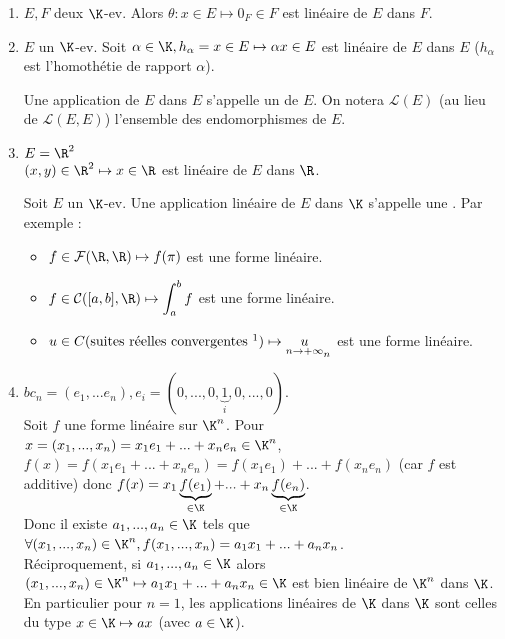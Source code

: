 \documentclass[12pt, a4paper]{report}
\begin{document}
\begin{exemple}[Exemples]{}
\begin{enumerate}
	\item $E,F$ deux $\K$-ev. Alors $\theta : x \in E \mapsto 0_F \in F$ est linéaire de $E$ dans $F$. 
	
	\item $E$ un $\K$-ev. Soit $\alpha \in \K, h_\alpha = x \in E \mapsto \alpha x \in E$ est linéaire de $E$ dans $E$ ($h_\alpha$ est l'homothétie de rapport $\alpha$).
	\begin{remarque}[Vocabulaire]{}
	Une application de $E$ dans $E$ s'appelle un  de $E$. On notera $\mathcal{L}(E)$ (au lieu de $\mathcal{L}(E,E)$) l'ensemble des endomorphismes de $E$.
	\end{remarque}
	
	\item $E = \R^2$ \\
	$(x,y) \in \R^2 \mapsto x \in \R$ est linéaire de $E$ dans $\R$.
	\begin{remarque}[Vocabulaire]{}
	Soit $E$ un $\K$-ev. Une application linéaire de $E$ dans $\K$ s'appelle une .
	Par exemple :
	\begin{itemize}
		\item $f \in \mathcal{F}(\R,\R) \mapsto f(\pi)$ est une forme linéaire.
		\item $f \in \mathcal{C}([a,b],\R) \mapsto \displaystyle{\int_{a}^b f}$ est une forme linéaire.
		\item $u \in C \text{(suites réelles convergentes \footnotemark)} \mapsto  \underset{n \to +\infty}u_n$ est une forme linéaire.
	\end{itemize}
	\end{remarque}
	
	\item {}
	
	$bc_n = (e_1,...e_n), e_i = (0,...,0,\underbrace{1}_{i},0,...,0)$. \\
	Soit $f$ une forme linéaire sur $\K^n$. Pour $x = (x_1,...,x_n) = x_1e_1+...+x_ne_n \in \K^n$, \\
	$f(x) = f(x_1e_1+...+x_ne_n) = f(x_1e_1)+ ...+f(x_ne_n)$ (car $f$ est additive)
	donc $f(x) = x_1\underbrace{f(e_1)}_{\in \K}+...+x_n\underbrace{f(e_n)}_{\in \K}$. \\
	Donc il existe $a_1,...,a_n \in \K$ tels que $\forall (x_1,...,x_n) \in \K^n, f(x_1,...,x_n) = a_1x_1+...+a_nx_n$. \\
	Réciproquement, si $a_1,...,a_n \in \K$ alors $(x_1,...,x_n) \in \K^n \mapsto a_1x_1+...+a_nx_n \in \K$ est bien linéaire de $\K^n$ dans $\K$. \\
	En particulier pour $n = 1$, les applications linéaires de $\K$ dans $\K$ sont celles du type $x \in \K \mapsto ax$ (avec $a \in \K$).
	

\end{enumerate}
\end{exemple}
\end{document}
